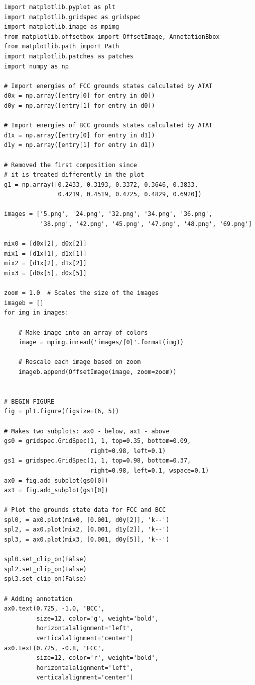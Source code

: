 \documentclass[number, sort&compress, review, 12pt]{elsarticle}
\begin{document}
\begin{verbatim}
import matplotlib.pyplot as plt
import matplotlib.gridspec as gridspec
import matplotlib.image as mpimg
from matplotlib.offsetbox import OffsetImage, AnnotationBbox
from matplotlib.path import Path
import matplotlib.patches as patches
import numpy as np

# Import energies of FCC grounds states calculated by ATAT
d0x = np.array([entry[0] for entry in d0])
d0y = np.array([entry[1] for entry in d0])

# Import energies of BCC grounds states calculated by ATAT
d1x = np.array([entry[0] for entry in d1])
d1y = np.array([entry[1] for entry in d1])

# Removed the first composition since
# it is treated differently in the plot
g1 = np.array([0.2433, 0.3193, 0.3372, 0.3646, 0.3833,
               0.4219, 0.4519, 0.4725, 0.4829, 0.6920])

images = ['5.png', '24.png', '32.png', '34.png', '36.png',
          '38.png', '42.png', '45.png', '47.png', '48.png', '69.png']

mix0 = [d0x[2], d0x[2]]
mix1 = [d1x[1], d1x[1]]
mix2 = [d1x[2], d1x[2]]
mix3 = [d0x[5], d0x[5]]

zoom = 1.0  # Scales the size of the images
imageb = []
for img in images:

    # Make image into an array of colors
    image = mpimg.imread('images/{0}'.format(img))

    # Rescale each image based on zoom
    imageb.append(OffsetImage(image, zoom=zoom))


# BEGIN FIGURE
fig = plt.figure(figsize=(6, 5))

# Makes two subplots: ax0 - below, ax1 - above
gs0 = gridspec.GridSpec(1, 1, top=0.35, bottom=0.09,
                        right=0.98, left=0.1)
gs1 = gridspec.GridSpec(1, 1, top=0.98, bottom=0.37,
                        right=0.98, left=0.1, wspace=0.1)
ax0 = fig.add_subplot(gs0[0])
ax1 = fig.add_subplot(gs1[0])

# Plot the grounds state data for FCC and BCC
spl0, = ax0.plot(mix0, [0.001, d0y[2]], 'k--')
spl2, = ax0.plot(mix2, [0.001, d1y[2]], 'k--')
spl3, = ax0.plot(mix3, [0.001, d0y[5]], 'k--')

spl0.set_clip_on(False)
spl2.set_clip_on(False)
spl3.set_clip_on(False)

# Adding annotation
ax0.text(0.725, -1.0, 'BCC',
         size=12, color='g', weight='bold',
         horizontalalignment='left',
         verticalalignment='center')
ax0.text(0.725, -0.8, 'FCC',
         size=12, color='r', weight='bold',
         horizontalalignment='left',
         verticalalignment='center')


\end{verbatim}
\end{document}
